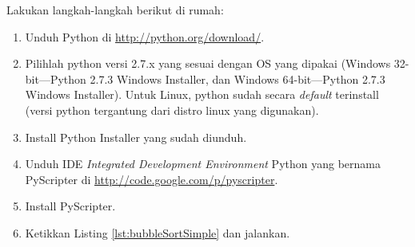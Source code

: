 \begin{pemrograman}
Lakukan langkah-langkah berikut di rumah:
\begin{enumerate}
	\item Unduh Python di \url{http://python.org/download/}.
	\item Pilihlah python versi 2.7.x yang sesuai dengan OS yang dipakai (Windows 32-bit---Python 2.7.3 Windows Installer, dan Windows 64-bit---Python 2.7.3 Windows Installer). Untuk Linux, python sudah secara \textit{default} terinstall (versi python tergantung dari distro linux yang digunakan).
	\item Install Python Installer yang sudah diunduh.
	\item Unduh IDE \textit{Integrated Development Environment} Python yang bernama PyScripter di \url{http://code.google.com/p/pyscripter}.
	\item Install PyScripter.
	\item Ketikkan Listing \ref{lst:bubbleSortSimple} dan jalankan.
\end{enumerate}
\end{pemrograman}

